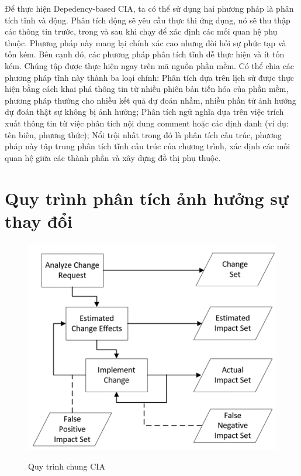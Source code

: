 \documentclass[12pt,a4paper]{report}
\begin{document}
Để thực hiện Depedency-based CIA, ta có thể sử dụng hai phương pháp là phân tích tĩnh và động. Phân tích động sẽ yêu cầu thực thi ứng dụng, nó sẽ thu thập các thông tin trước, trong và sau khi chạy để xác định các mối quan hệ phụ thuộc. Phương pháp này mang lại chính xác cao nhưng đòi hỏi sự phức tạp và tốn kém. Bên cạnh đó, các phương pháp phân tích tĩnh dễ thực hiện và ít tốn kém. Chúng tập được thực hiện ngay trên mã nguồn phần mềm. Có thể chia các phương pháp tĩnh này thành ba loại chính: Phân tích dựa trên lịch sử được thực hiện bằng cách khai phá thông tin từ nhiều phiên bản tiến hóa của phần mềm, phương pháp thường cho nhiều kết quả dự đoán nhầm, nhiều phần tử ảnh hưởng dự đoán thật sự không bị ảnh hưởng; Phân tích ngữ nghĩa dựa trên việc trích xuất thông tin từ việc phân tích nội dung comment hoặc các định danh (ví dụ: tên biến, phương thức); Nổi trội nhất trong đó là phân tích cấu trúc, phương pháp này tập trung phân tích tĩnh cấu trúc của chương trình, xác định các mối quan hệ giữa các thành phần và xây dựng đồ thị phụ thuộc.\\

\section{Quy trình phân tích ảnh hưởng sự thay đổi}
\begin{figure}[h]
	\centering
	\includegraphics[scale=0.8]{CIA-process}
	\label{fig:cia-process}
	\caption{Quy trình chung CIA}
\end{figure}
\end{document}
